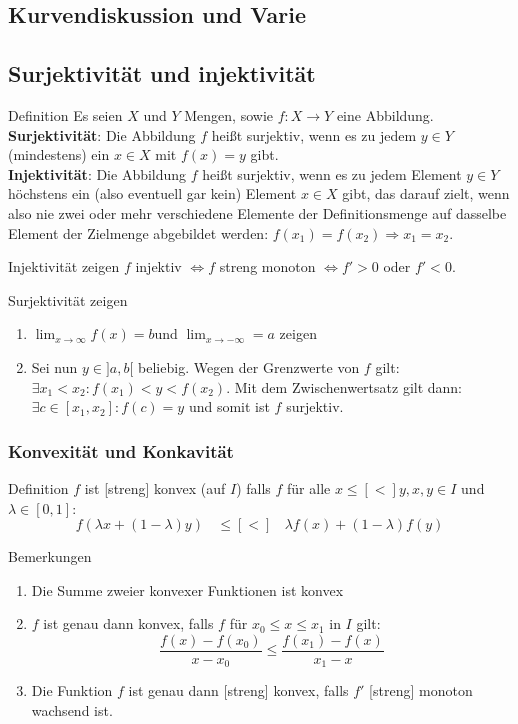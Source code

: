 \documentclass[a4paper,8pt]{extarticle}
\begin{document}
\subsection{Kurvendiskussion und Varie}
\subsection{Surjektivität und injektivität}
\begin{mainbox}{Definition}
  Es seien $X$ und $Y$ Mengen, sowie $f: X \rightarrow Y$ eine Abbildung.\\
  \textbf{Surjektivität}: Die Abbildung $f$ heißt surjektiv, wenn es zu jedem  $y \in Y$ (mindestens) ein  $x \in X$ mit $f(x)=y$ gibt. \\
  \textbf{Injektivität}: Die Abbildung $f$ heißt surjektiv, wenn es zu jedem Element $y \in Y$ höchstens ein (also eventuell gar kein) Element $x \in X$ gibt, das darauf zielt, wenn also nie zwei oder mehr verschiedene Elemente der Definitionsmenge auf dasselbe Element der Zielmenge abgebildet werden: $f(x_1)=f(x_2) \Rightarrow x_1=x_2$.
\end{mainbox}

\begin{subbox}{Injektivität zeigen}
  $f$ injektiv $\Leftrightarrow f$ streng monoton $\Leftrightarrow f' > 0$ oder $f' < 0$.
\end{subbox}

\begin{subbox}{Surjektivität zeigen}
  \begin{enumerate}
    \item $\lim_{x\to \infty} f(x) = b $und $\lim_{x\to -\infty}= a$ zeigen
    \item Sei nun $y \in]a, b[$ beliebig. Wegen der Grenzwerte von $f$ gilt: $\exists x_1 < x_2 : f(x_1) < y < f(x_2)$. Mit dem Zwischenwertsatz gilt dann: $\exists c \in [x_1, x_2] : f(c) = y$ und somit ist $f$ surjektiv.
  \end{enumerate}
\end{subbox}

\subsubsection{Konvexität und Konkavität}
\begin{mainbox}{Definition}
  $f$ ist [streng] konvex (auf $I$) falls $f$ für alle $x \leq [<] y, x, y \in I$ und $\lambda \in [0, 1]$:
  $$f(\lambda x + (1 - \lambda) y) \ \ \ \ \leq [<] \ \ \ \ \lambda f(x) + (1 - \lambda)f(y)$$
\end{mainbox}
\begin{mainbox}{Bemerkungen}
  \begin{enumerate}
    \item Die Summe zweier konvexer Funktionen ist konvex
    \item $f$ ist genau dann konvex, falls $f$ für $x_0 \leq x \leq x_1$ in $I$ gilt:
          $$\frac{f(x) - f(x_0)}{x - x_0} \leq \frac{f(x_1) - f(x)}{x_1 - x}$$
    \item Die Funktion $f$ ist genau dann [streng] konvex, falls $f'$
          [streng] monoton wachsend ist.  
  \end{enumerate}
\end{mainbox}
\end{document}
